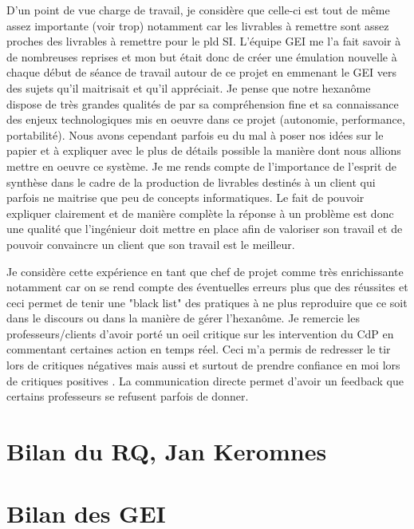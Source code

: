 D'un point de vue charge de travail, je considère que celle-ci est tout de même assez importante (voir trop) notamment car les livrables à remettre sont assez proches des livrables à remettre pour le pld SI. L'équipe GEI me l'a fait savoir à de nombreuses reprises et mon but était donc de créer une émulation nouvelle à chaque début de séance de travail autour de ce projet en emmenant le GEI vers des sujets qu'il maitrisait et qu'il appréciait. Je pense que notre hexanôme dispose de très grandes qualités de par sa compréhension fine et sa connaissance des enjeux technologiques mis en oeuvre dans ce projet (autonomie, performance, portabilité). Nous avons cependant parfois eu du mal à poser nos idées sur le papier et à expliquer avec le plus de détails possible la manière dont nous allions mettre en oeuvre ce système. Je me rends compte de l'importance de l'esprit de synthèse dans le cadre de la production de livrables destinés à un client qui parfois ne maitrise que peu de concepts informatiques. Le fait de pouvoir expliquer clairement et de manière complète la réponse à un problème est donc une qualité que l'ingénieur doit mettre en place afin de valoriser son travail et de pouvoir convaincre un client que son travail est le meilleur.

Je considère cette expérience en tant que chef de projet comme très enrichissante notamment car on se rend compte des éventuelles erreurs plus que des réussites et ceci permet de tenir une "black list" des pratiques à ne plus reproduire que ce soit dans le discours ou dans la manière de gérer l'hexanôme.
Je remercie les professeurs/clients d'avoir porté un oeil critique sur les intervention du CdP en commentant certaines action en temps réel. Ceci m'a permis de redresser le tir lors de critiques \og négatives \fg mais aussi et surtout de prendre confiance en moi lors de critiques \og positives \fg. La communication directe permet d'avoir un feedback que certains professeurs se refusent parfois de donner.



\section{Bilan du RQ, Jan Keromnes}
\section{Bilan des GEI}
